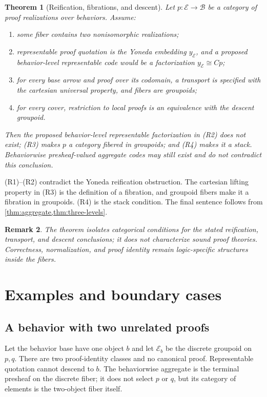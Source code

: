 \documentclass[12pt,a4paper,twoside]{extarticle}
\makeatletter
\theoremstyle{compactplain}
\newtheorem{theorem}{Theorem}[section]
\theoremstyle{compactdef}
\newtheorem{remark}[theorem]{Remark}
\renewenvironment{proof}[1][\proofname]{\par\pushQED{\qed}\normalfont
  \topsep2pt\trivlist\item[\hskip\labelsep\bfseries #1\@addpunct{.}]\ignorespaces}
 {\popQED\endtrivlist\@endpefalse}
\makeatother
\begin{document}
\begin{theorem}[Reification, fibrations, and descent]
Let $p:\mathcal E\to\mathcal B$ be a category of proof realizations over behaviors. Assume:
\begin{enumerate}[label=(R\arabic*)]
\item some fiber contains two nonisomorphic realizations;
\item representable proof quotation is the Yoneda embedding $y_{\mathcal E}$, and a proposed behavior-level representable code would be a factorization $y_{\mathcal E}\cong Cp$;
\item for every base arrow and proof over its codomain, a transport is specified with the cartesian universal property, and fibers are groupoids;
\item for every cover, restriction to local proofs is an equivalence with the descent groupoid.
\end{enumerate}
Then the proposed behavior-level representable factorization in (R2) does not exist; (R3) makes $p$ a category fibered in groupoids; and (R4) makes it a stack. Behaviorwise presheaf-valued aggregate codes may still exist and do not contradict this conclusion.
\end{theorem}
\begin{proof}
(R1)--(R2) contradict the Yoneda reification obstruction. The cartesian lifting property in (R3) is the definition of a fibration, and groupoid fibers make it a fibration in groupoids. (R4) is the stack condition. The final sentence follows from \cref{thm:aggregate,thm:three-levels}.
\end{proof}

\begin{remark}
The theorem isolates categorical conditions for the stated reification, transport, and descent conclusions; it does not characterize sound proof theories. Correctness, normalization, and proof identity remain logic-specific structures inside the fibers.
\end{remark}
\section{Examples and boundary cases}

\subsection{A behavior with two unrelated proofs}
Let the behavior base have one object $b$ and let $\mathcal E_b$ be the discrete groupoid on $p,q$. There are two proof-identity classes and no canonical proof. Representable quotation cannot descend to $b$. The behaviorwise aggregate is the terminal presheaf on the discrete fiber; it does not select $p$ or $q$, but its category of elements is the two-object fiber itself.
\end{document}
